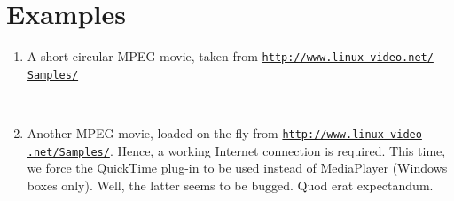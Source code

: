 \documentclass[a4paper]{article}
\begin{document}
\section{Examples}\label{examples}
\begin{enumerate}
\item A short circular MPEG movie, taken from \href{http://www.linux-video.net/Samples/}{\tt http://www.linux-video.net/} \href{http://www.linux-video.net/Samples/}{\tt Samples/}

\begin{minipage}{0.5\linewidth}
{\tt%
  \string{}\string{\\
  \phantom{xx}.5\string\linewidth\\
  \string}\string{\\
  \phantom{xx}.375\string\linewidth\\
  \string}
}
\end{minipage}%
\begin{minipage}{0.5\linewidth}
\begin{center}
\end{center}
\end{minipage}

\newpage
\item Another MPEG movie, loaded on the fly from \href{http://www.linux-video.net/Samples/}{\tt http://www.linux-video} \href{http://www.linux-video.net/Samples/}{\tt .net/Samples/}. Hence, a working Internet connection is required. This time, we force the QuickTime plug-in to be used instead of MediaPlayer (Windows boxes only). Well, the latter seems to be bugged. Quod erat expectandum.


\end{enumerate}
\end{document}

